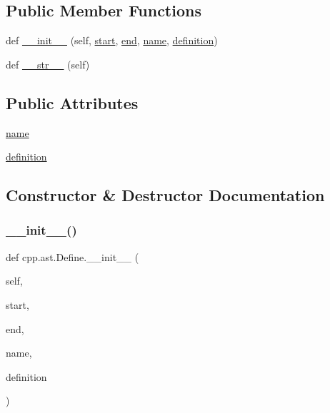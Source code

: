 \subsection*{Public Member Functions}
\begin{DoxyCompactItemize}
\item 
def \hyperlink{classcpp_1_1ast_1_1_define_ae9af61866e010a863ba9f8818ec8924c}{\+\_\+\+\_\+init\+\_\+\+\_\+} (self, \hyperlink{classcpp_1_1ast_1_1_node_a7b2aa97e6a049bb1a93aea48c48f1f44}{start}, \hyperlink{classcpp_1_1ast_1_1_node_a3c5e5246ccf619df28eca02e29d69647}{end}, \hyperlink{classcpp_1_1ast_1_1_define_a8879216f09e88f79d7baa49bcfa10ebd}{name}, \hyperlink{classcpp_1_1ast_1_1_define_a0c636652dfeb2f15e62793afea1153c9}{definition})
\item 
def \hyperlink{classcpp_1_1ast_1_1_define_aa89732914b19901c8d291e11f34bb627}{\+\_\+\+\_\+str\+\_\+\+\_\+} (self)
\end{DoxyCompactItemize}
\subsection*{Public Attributes}
\begin{DoxyCompactItemize}
\item 
\hyperlink{classcpp_1_1ast_1_1_define_a8879216f09e88f79d7baa49bcfa10ebd}{name}
\item 
\hyperlink{classcpp_1_1ast_1_1_define_a0c636652dfeb2f15e62793afea1153c9}{definition}
\end{DoxyCompactItemize}


\subsection{Constructor \& Destructor Documentation}
\mbox{\label{classcpp_1_1ast_1_1_define_ae9af61866e010a863ba9f8818ec8924c}} 
\subsubsection{\texorpdfstring{\+\_\+\+\_\+init\+\_\+\+\_\+()}{\_\_init\_\_()}}
{\footnotesize\ttfamily def cpp.\+ast.\+Define.\+\_\+\+\_\+init\+\_\+\+\_\+ (\begin{DoxyParamCaption}\item[{}]{self,  }\item[{}]{start,  }\item[{}]{end,  }\item[{}]{name,  }\item[{}]{definition }\end{DoxyParamCaption})}



